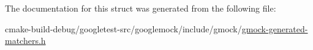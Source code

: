 The documentation for this struct was generated from the following file\+:\begin{DoxyCompactItemize}
\item 
cmake-\/build-\/debug/googletest-\/src/googlemock/include/gmock/\mbox{\hyperlink{gmock-generated-matchers_8h}{gmock-\/generated-\/matchers.\+h}}\end{DoxyCompactItemize}
